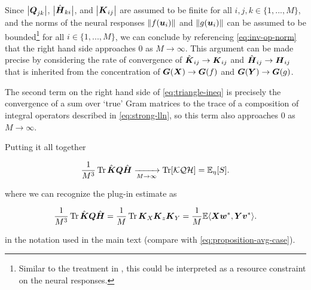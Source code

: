 Since $\big{|} \boldsymbol{Q}_{jk} \big{|}$, $\big{|}\hat{\boldsymbol{H}}_{ki}\big{|}$, and $\big{|}\boldsymbol{K}_{ij}\big{|}$ are assumed to be finite for all $i, j, k \in \{1, ... ,M \}$, and the norms of the neural responses $\| f(\boldsymbol{u}_i)\|$ and $\| g(\boldsymbol{u}_i)\|$ can be assumed to be bounded\footnote{Similar to the treatment in \cite{pospisil2024estimating}, this could be interpreted as a resource constraint on the neural responses.} for all $i \in \{1, ... ,M \}$, we can conclude by referencing \cref{eq:inv-op-norm} that the right hand side approaches $0$ as $M \rightarrow \infty$.  
This argument can be made precise by considering the rate of convergence of $\hat{\boldsymbol{K}}_{ij} \rightarrow \boldsymbol{K}_{ij}$ and $\hat{\boldsymbol{H}}_{ij} \rightarrow \boldsymbol{H}_{ij}$ that is inherited from the concentration of $\boldsymbol{G}(\boldsymbol{X}) \rightarrow \boldsymbol{G}(f)$ and $\boldsymbol{G}(\boldsymbol{Y}) \rightarrow \boldsymbol{G}(g)$.

The second term on the right hand side of \cref{eq:triangle-ineq} is precisely the convergence of a sum over `true' Gram matrices to the trace of a composition of integral operators described in \cref{eq:strong-lln}, so this term also approaches $0$ as $M \rightarrow \infty$.    

Putting it all together

\begin{equation}
\frac{1}{M^3} \operatorname*{Tr} \hat{\boldsymbol{K}} \boldsymbol{Q} \hat{\boldsymbol{H}}  \xrightarrow[M\rightarrow \infty]{}  \operatorname*{Tr} [\mathcal{K}\mathcal{Q} \mathcal{H}] =\mathbb{E}_{\eta}[S].
\end{equation}

where we can recognize the plug-in estimate as 

\begin{equation}
    \frac{1}{M^3} \operatorname*{Tr} \hat{\boldsymbol{K}} \boldsymbol{Q} \hat{\boldsymbol{H}} = \frac{1}{M} \operatorname*{Tr} \boldsymbol{K}_X \boldsymbol{K}_z \boldsymbol{K}_Y = \frac{1}{M}\mathbb{E} \langle \boldsymbol{X} \boldsymbol{w}^*, \boldsymbol{Y} \boldsymbol{v}^* \rangle.
\end{equation}

in the notation used in the main text (compare with \cref{eq:proposition-avg-case}).  
